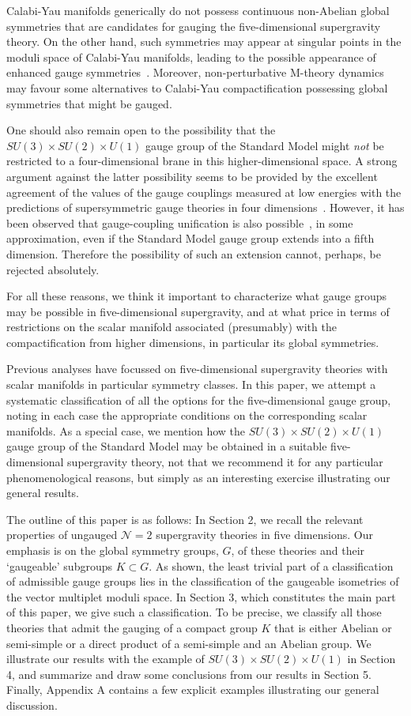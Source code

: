 \documentclass[a4paper,11pt]{article}
\begin{document}
Calabi-Yau manifolds generically do not possess continuous non-Abelian
global symmetries that are candidates for gauging the five-dimensional
supergravity theory. On the other hand, such symmetries may appear at
singular points in the moduli space of Calabi-Yau manifolds, leading to
the possible appearance of enhanced gauge symmetries~\cite{singularities}.
Moreover, non-perturbative M-theory dynamics may favour some alternatives
to Calabi-Yau compactification possessing global symmetries that might be
gauged. 

One should also remain open to the possibility that the $SU(3) \times
SU(2) \times U(1)$ gauge group of the Standard Model might {\it not} be
restricted to a four-dimensional brane in this higher-dimensional space. A
strong argument against the latter possibility seems to be provided by the
excellent agreement of the values of the gauge couplings measured at low
energies with the predictions of supersymmetric gauge theories in four
dimensions~\cite{GR}. However, it has been observed that gauge-coupling
unification is also possible~\cite{DDG}, in some approximation, even if
the Standard Model gauge group extends into a fifth dimension. Therefore
the possibility of such an extension cannot, perhaps, be rejected
absolutely.

For all these reasons, we think it important to characterize what gauge groups may be 
possible in five-dimensional supergravity, and at what price in terms of restrictions on 
the scalar manifold associated (presumably) with the compactification from higher 
dimensions, in particular its global symmetries.

Previous analyses have focussed on five-dimensional supergravity theories
with scalar manifolds in particular symmetry classes. In this paper, we
attempt a systematic classification of all the options for the
five-dimensional gauge group, noting in each case the appropriate
conditions on the corresponding scalar manifolds. As a special case, we
mention how the $SU(3) \times SU(2) \times U(1)$ gauge group of the
Standard Model may be obtained in a suitable five-dimensional supergravity
theory, not that we recommend it for any particular phenomenological
reasons, but simply as an interesting exercise illustrating our general
results.

The outline of this paper is as follows: In Section 2, we recall the
relevant properties of ungauged $\mathcal{N}=2$ supergravity theories in
five dimensions. Our emphasis is on the global symmetry groups, $G$, of
these theories and their `gaugeable' subgroups $K\subset G$. As shown, the
least trivial part of a classification of admissible gauge groups lies in
the classification of the gaugeable isometries of the vector multiplet
moduli space. In Section 3, which constitutes the main part of this paper,
we give such a classification.  To be precise, we classify all those
theories that admit the gauging of a compact group $K$ that is either
Abelian or semi-simple or a direct product of a semi-simple and an Abelian
group. We illustrate our results with the example of $SU(3) \times SU(2)
\times U(1)$ in Section 4, and summarize and draw some conclusions from
our results in Section 5.  Finally, Appendix A contains a few explicit
examples illustrating our general discussion.
\end{document}
